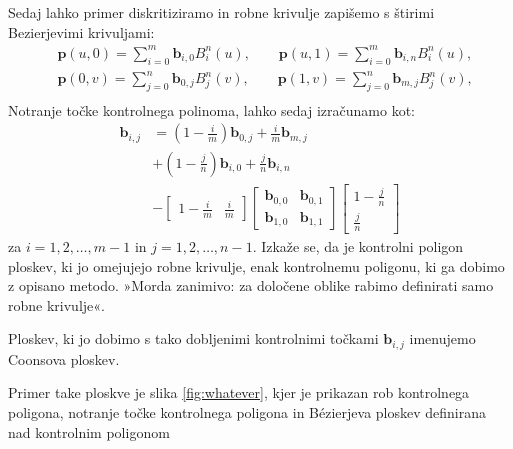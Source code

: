 \documentclass[a4paper,12pt]{article}
\begin{document}
Sedaj lahko primer diskritiziramo in robne krivulje zapišemo s štirimi 
Bezierjevimi krivuljami:
\begin{align*}
    &\mathbf{p}(u,0) =\sum_{i=0}^m \mathbf{b}_{i,0} B_i^n(u), \qquad
    \mathbf{p}(u,1) =\sum_{i=0}^m \mathbf{b}_{i,n} B_i^n(u),  \\
    &\mathbf{p}(0,v) =\sum_{j=0}^n \mathbf{b}_{0,j} B_j^n(v), \qquad
    \mathbf{p}(1,v) =\sum_{j=0}^n \mathbf{b}_{m,j} B_j^n(v),  \\
 \end{align*}
Notranje točke kontrolnega polinoma, 
lahko sedaj izračunamo kot: 
\begin{align*}
   \mathbf{b}_{i,j} &= \left(1 - \frac{i}{m}\right)\mathbf{b}_{0,j} +\frac{i}{m}\mathbf{b}_{m,j}\\
    &+ \left(1 - \frac{j}{n}\right)\mathbf{b}_{i,0} +\frac{j}{n}\mathbf{b}_{i,n}\ \\
   &- 
   \begin{bmatrix} 
      1 - \frac{i}{m} & \frac{i}{m}
   \end{bmatrix}
   \begin{bmatrix} 
      \mathbf{b}_{0,0} & \mathbf{b}_{0,1}\\
      \mathbf{b}_{1,0} & \mathbf{b}_{1,1}
   \end{bmatrix}
   \begin{bmatrix}
      1 - \frac{j}{n}\\
      \frac{j}{n}
   \end{bmatrix}
\end{align*}
za $i = 1,2,\dots,m-1$ in $j = 1,2,\dots,n-1$. Izkaže se, da je kontrolni poligon ploskev, 
ki jo omejujejo robne krivulje,   enak kontrolnemu poligonu, ki ga dobimo z opisano metodo. 
»Morda zanimivo: za določene oblike rabimo definirati samo robne krivulje«.

Ploskev, ki jo dobimo s tako dobljenimi kontrolnimi točkami $\mathbf{b}_{i,j}$
imenujemo Coonsova ploskev.

Primer take ploskve je slika \ref{fig:whatever}, kjer je prikazan 
rob kontrolnega poligona, notranje točke kontrolnega poligona in 
Bézierjeva ploskev definirana nad kontrolnim poligonom
\end{document}
